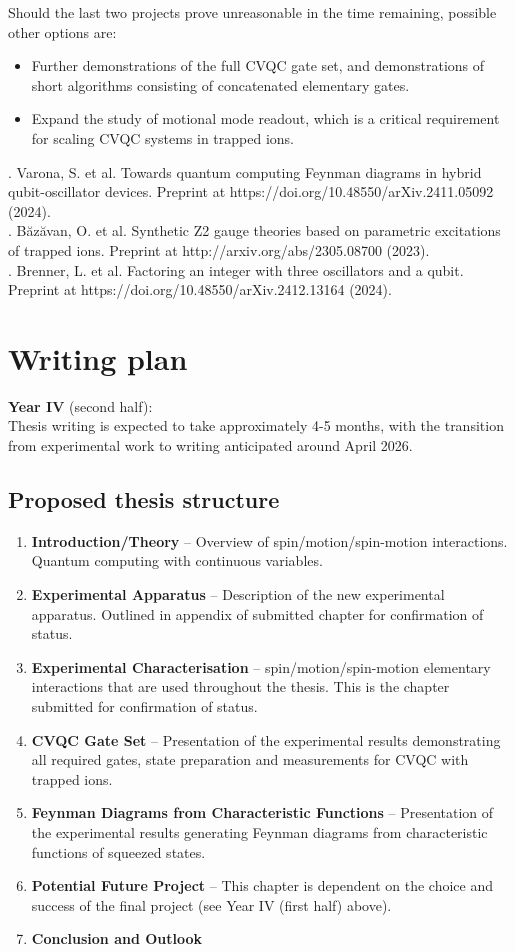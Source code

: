 \documentclass[12pt]{article}
\begin{document}
\noindent Should the last two projects prove unreasonable in the time remaining, possible other options are:
\begin{itemize}
\item Further demonstrations of the full CVQC gate set, and demonstrations of short algorithms consisting of concatenated elementary gates.
\item Expand the study of motional mode readout, which is a critical requirement for scaling CVQC systems in trapped ions.
\end{itemize}
. Varona, S. et al. Towards quantum computing Feynman diagrams in hybrid qubit-oscillator devices. Preprint at https://doi.org/10.48550/arXiv.2411.05092 (2024).\\
. B\u{a}z\u{a}van, O. et al. Synthetic Z2 gauge theories based on parametric excitations of trapped ions. Preprint at http://arxiv.org/abs/2305.08700 (2023).\\
. Brenner, L. et al. Factoring an integer with three oscillators and a qubit. Preprint at https://doi.org/10.48550/arXiv.2412.13164 (2024).\\

\section{Writing plan}
\noindent \textbf{Year IV} (second half): \\
Thesis writing is expected to take approximately 4-5 months, with the transition from experimental work to writing anticipated around April 2026.\\
\subsection*{Proposed thesis structure}
\begin{enumerate}
    \item \textbf{Introduction/Theory} -- Overview of spin/motion/spin-motion interactions. Quantum computing with continuous variables. 
    \item \textbf{Experimental Apparatus} -- Description of the new experimental apparatus. Outlined in appendix of submitted chapter for confirmation of status.
    \item \textbf{Experimental Characterisation} -- spin/motion/spin-motion elementary interactions that are used throughout the thesis. This is the chapter submitted for confirmation of status.
    \item \textbf{CVQC Gate Set} -- Presentation of the experimental results demonstrating all required gates, state preparation and measurements for CVQC with trapped ions.
    \item \textbf{Feynman Diagrams from Characteristic Functions} -- Presentation of the experimental results generating Feynman diagrams from characteristic functions of squeezed states.
    \item \textbf{Potential Future Project} -- This chapter is dependent on the choice and success of the final project (see Year IV (first half) above).
    \item \textbf{Conclusion and Outlook} 
\end{enumerate}
\end{document}
